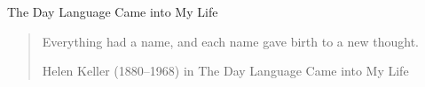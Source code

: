 




\begin{frame}{The Day Language Came into My Life}



  \blockquote[Helen Keller (1880--1968) in The Day Language Came into My Life]{
    Everything had a name, and each name gave birth to a new thought.
  }





%






\end{frame}










